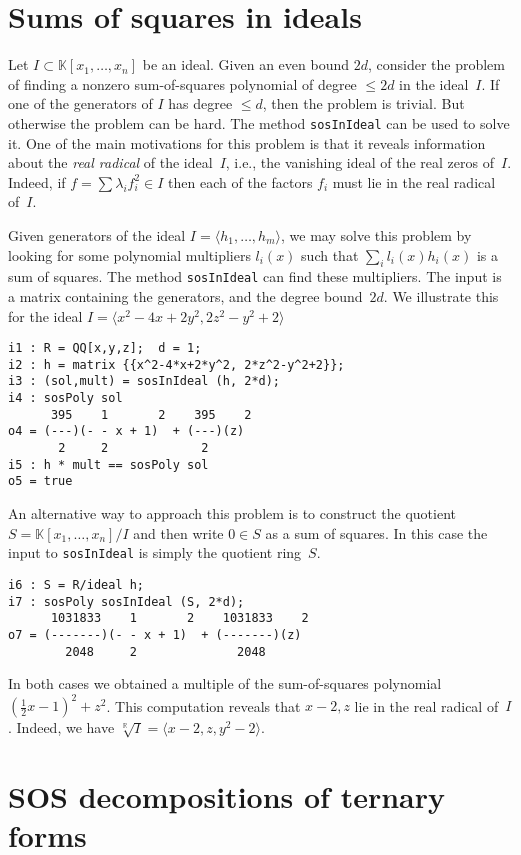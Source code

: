 \documentclass[11pt]{amsart}
\theoremstyle{plain}%
\theoremstyle{definition}
\theoremstyle{remark}
\newcommand{\RR}{\mathbb{R}}
\newcommand{\kk}{\mathbb{K}}
\begin{document}
\section{Sums of squares in ideals}
Let $I \subset \kk[x_{1},\dots,x_{n}]$ be an ideal.  
Given an even bound $2d$, consider the problem of finding a nonzero sum-of-squares polynomial of degree $\leq \!2d$ in the ideal~$I$.
If one of the generators of $I$ has degree $\leq \!d$, then the problem is trivial.
But otherwise the problem can be hard.
The method \verb|sosInIdeal| can be used to solve it.
One of the main motivations for this problem is that it reveals information about the \emph{real radical} of the ideal~$I$, 
i.e., the vanishing ideal of the real zeros of~$I$.
Indeed, if $f = \sum \lambda_i f_i^2 \in I$ then each of the factors $f_i$ must lie in the real radical of~$I$.

Given generators of the ideal $I=\langle h_1,\dots,h_m\rangle$, we may solve this problem by looking for some polynomial multipliers $l_i(x)$ such that  $\sum_i l_i(x) h_i(x)$ is a sum of squares.
The method \verb|sosInIdeal| can find these multipliers.
The input is a matrix containing the generators, and the degree bound~$2d$.
We illustrate this for the ideal 
$I=\langle x^2{-}4 x{+}2 y^2, 2 z^2{-}y^2{+}2 \rangle$
{\small
\begin{verbatim}
i1 : R = QQ[x,y,z];  d = 1;
i2 : h = matrix {{x^2-4*x+2*y^2, 2*z^2-y^2+2}};
i3 : (sol,mult) = sosInIdeal (h, 2*d);
i4 : sosPoly sol
      395    1       2    395    2
o4 = (---)(- - x + 1)  + (---)(z)
       2     2             2
i5 : h * mult == sosPoly sol
o5 = true
\end{verbatim}
}
\noindent
An alternative way to approach this problem is to construct the quotient $S = \kk[x_{1},\dots,x_{n}]/I$ and then write $0\in S$ as a sum of squares.
In this case the input to \verb|sosInIdeal| is simply the quotient ring~$S$.
{\small
\begin{verbatim}
i6 : S = R/ideal h;
i7 : sosPoly sosInIdeal (S, 2*d);
      1031833    1       2    1031833    2
o7 = (-------)(- - x + 1)  + (-------)(z)
        2048     2              2048
\end{verbatim}
}
\noindent
In both cases we obtained a multiple of the sum-of-squares polynomial $(\frac{1}{2}x{-}1)^2{+}z^2$.
This computation reveals that $x{-}2,z$ lie in the real radical of~$I$.
Indeed, we have $\sqrt[\RR]{I} = \langle x{-}2,z,y^2{-}2\rangle$.

\section{SOS decompositions of ternary forms}
\end{document}
